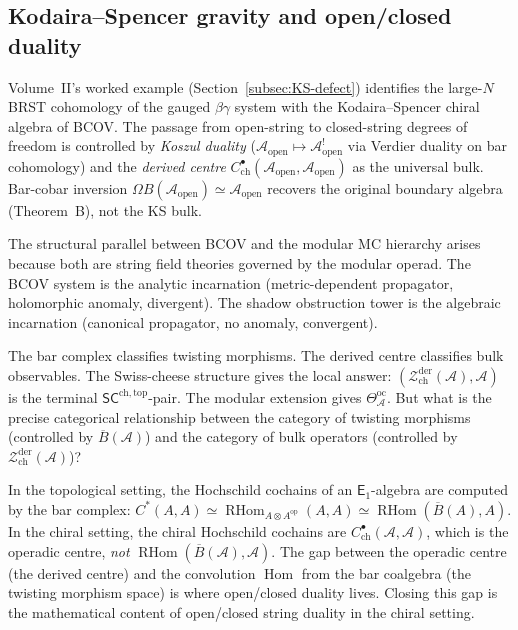 \documentclass[11pt]{article}
\newcommand{\cA}{\mathcal{A}}
\newcommand{\cZ}{\mathcal{Z}}
\newcommand{\barB}{\overline{B}}
\newcommand{\Eone}{\mathsf{E}_1}
\newcommand{\SCchtop}{\mathsf{SC}^{\mathrm{ch,top}}}
\newcommand{\Hom}{\operatorname{Hom}}
\newcommand{\RHom}{\operatorname{RHom}}
\newcommand{\Zder}{\cZ^{\mathrm{der}}_{\mathrm{ch}}}
\begin{document}
\subsection{Kodaira--Spencer gravity and open/closed duality}

Volume~II's worked example (Section~\ref{subsec:KS-defect})
identifies the large-$N$ BRST cohomology of the gauged
$\beta\gamma$ system with the Kodaira--Spencer chiral algebra
of BCOV.  The passage from open-string to closed-string
degrees of freedom is controlled by \emph{Koszul duality}
($\cA_{\mathrm{open}} \mapsto \cA^!_{\mathrm{open}}$ via
Verdier duality on bar cohomology) and the \emph{derived
centre} $C^\bullet_{\mathrm{ch}}(\cA_{\mathrm{open}},
\cA_{\mathrm{open}})$ as the universal bulk.  Bar-cobar
inversion $\Omega B(\cA_{\mathrm{open}}) \simeq
\cA_{\mathrm{open}}$ recovers the original boundary algebra
(Theorem~B), not the KS bulk.

The structural parallel between BCOV and the modular MC
hierarchy arises because both are string field theories governed
by the modular operad.  The BCOV system is the analytic
incarnation (metric-dependent propagator, holomorphic anomaly,
divergent).  The shadow obstruction tower is the algebraic incarnation
(canonical propagator, no anomaly, convergent).

\begin{question}
\label{q:open-closed-vol2}
The bar complex classifies twisting morphisms.  The derived
centre classifies bulk observables.  The Swiss-cheese structure
gives the local answer: $(\Zder(\cA), \cA)$ is the terminal
$\SCchtop$-pair.  The modular extension gives
$\Theta^{\mathrm{oc}}_\cA$.  But what is the precise categorical
relationship between the category of twisting morphisms
(controlled by $\barB(\cA)$) and the category of bulk operators
(controlled by $\Zder(\cA)$)?

In the topological setting, the Hochschild cochains of an
$\Eone$-algebra are computed by the bar complex: $C^*(A,A)
\simeq \RHom_{A \otimes A^{\mathrm{op}}}(A,A) \simeq
\RHom(\barB(A), A)$.  In the chiral setting, the chiral
Hochschild cochains are $C^\bullet_{\mathrm{ch}}(\cA,\cA)$,
which is the operadic centre, \emph{not} $\RHom(\barB(\cA),
\cA)$.  The gap between the operadic centre (the derived
centre) and the convolution $\Hom$ from the bar coalgebra
(the twisting morphism space) is where open/closed duality
lives.  Closing this gap is the mathematical content of
open/closed string duality in the chiral setting.
\end{question}
\end{document}
